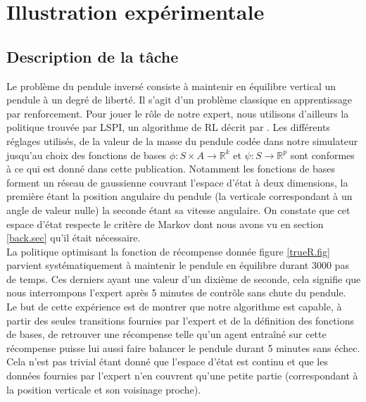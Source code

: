 \documentclass[publibook-draft]{CAp2012}
\begin{document}
\section{Illustration expérimentale}
\label{exp.sec}
\subsection{Description de la tâche}
Le problème du pendule inversé consiste à maintenir en équilibre vertical un pendule à un degré de liberté. Il s'agit d'un problème classique en apprentissage par renforcement. Pour jouer le rôle de notre expert, nous utilisons d'ailleurs la politique trouvée par LSPI, un algorithme de RL décrit par \citet{lagoudakis2003least}. Les différents réglages utilisés, de la valeur de la masse du pendule codée dans notre simulateur jusqu'au choix des fonctions de bases $\phi : S\times A \rightarrow \mathbb{R}^k$ et $\psi : S \rightarrow \mathbb{R}^p$ sont conformes à ce qui est donné dans cette publication. Notamment les fonctions de bases forment un réseau de gaussienne couvrant l'espace d'état à deux dimensions, la première étant la position angulaire du pendule (la verticale correspondant à un angle de valeur nulle) la seconde étant sa vitesse angulaire. On constate que cet espace d'état respecte le critère de Markov dont nous avons vu en section \ref{back.sec} qu'il était nécessaire.\\

La politique optimisant la fonction de récompense donnée figure \ref{trueR.fig} parvient systématiquement à maintenir le pendule en équilibre durant 3000 pas de temps. Ces derniers ayant une valeur d'un dixième de seconde, cela signifie que nous interrompons l'expert après 5 minutes de contrôle sans chute du pendule.\\

Le but de cette expérience est de montrer que notre algorithme est capable, à partir des seules transitions fournies par l'expert et de la définition des fonctions de bases, de retrouver une récompense telle qu'un agent entraîné sur cette récompense puisse lui aussi faire balancer le pendule durant 5 minutes sans échec. Cela n'est pas trivial étant donné que l'espace d'état est continu et que les données fournies par l'expert n'en couvrent qu'une petite partie (correspondant à la position verticale et son voisinage proche).\\
\end{document}
